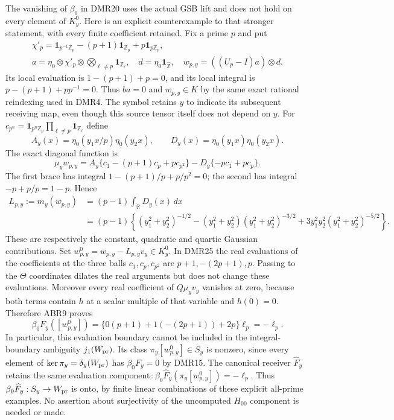 The vanishing of $\beta_0$ in DMR20 uses the actual GSB lift
and does not hold on every element of $K_y^0$. Here is an
explicit counterexample to that stronger statement, with
every finite coefficient retained. Fix a prime $p$ and put
\begin{equation}\tag{DMR24}
\begin{gathered}
\chi'_p=\mathbf1_{p^{-1}\mathbb Z_p}
              -(p+1)\mathbf1_{\mathbb Z_p}
              +p\mathbf1_{p\mathbb Z_p},\\
a=\eta_0\otimes\chi'_p\otimes
                  \bigotimes_{\ell\ne p}\mathbf1_{\mathbb Z_\ell},
\quad d=\eta_0\mathbf1_{\widehat{\mathbb Z}},
\quad w_{p,y}=((U_p-I)a)\otimes d.
\end{gathered}
\end{equation}
Its local evaluation is $1-(p+1)+p=0$, and its local integral
is $p-(p+1)+p p^{-1}=0$. Thus $ba=0$ and
$w_{p,y}\in K$ by the same exact rational reindexing used in
DMR4. The symbol retains $y$ to indicate its subsequent
receiving map, even though this source tensor itself does not
depend on $y$.
For $c_{p^n}=\mathbf1_{p^n\mathbb Z_p}
\prod_{\ell\ne p}\mathbf1_{\mathbb Z_\ell}$ define
\[
A_y(x)=\eta_0(y_1x/p)\eta_0(y_2x),\qquad
D_y(x)=\eta_0(y_1x)\eta_0(y_2x).
\]
The exact diagonal function is
\begin{equation}\tag{DMR25}
\mu_yw_{p,y}
=A_y\{c_1-(p+1)c_p+pc_{p^2}\}
 -D_y\{-pc_1+pc_p\}.
\end{equation}
The first brace has integral $1-(p+1)/p+p/p^2=0$;
the second has integral $-p+p/p=1-p$. Hence
\begin{equation}\tag{DMR26}
\begin{split}
L_{p,y}:=m_y(w_{p,y})
 &=(p-1)\int_{\mathbb R}D_y(x)\,dx\\
 &=(p-1)\left\{
 (y_1^2+y_2^2)^{-1/2}
 -(y_1^2+y_2^2)(y_1^2+y_2^2)^{-3/2}
 +3y_1^2y_2^2(y_1^2+y_2^2)^{-5/2}\right\}.
\end{split}
\end{equation}
These are respectively the constant, quadratic and quartic
Gaussian contributions. Set
$w^0_{p,y}=w_{p,y}-L_{p,y}v_y\in K_y^0$.
In DMR25 the real evaluations of the coefficients at the
three balls $c_1,c_p,c_{p^2}$ are
$p+1,-(2p+1),p$. Passing to the $\Theta$ coordinates dilates
the real arguments but does not change these evaluations.
Moreover every real coefficient of $Q\mu_yv_y$ vanishes
at zero, because both terms contain $h$ at a scalar multiple
of that variable and $h(0)=0$. Therefore ABR9 proves
\begin{equation}\tag{DMR27}
\beta_0F_y([w^0_{p,y}])
=\{0(p+1)+1(-(2p+1))+2p\}\ell_p=-\ell_p.
\end{equation}
In particular, this evaluation boundary cannot be included in
the integral-boundary ambiguity $j_1(W_{\rm pr})$.
Its class $\pi_y[w^0_{p,y}]\in S_y$ is nonzero, since every
element of $\ker\pi_y=\delta_y(W_{\rm pr})$ has
$\beta_0F_y=0$ by DMR15. The canonical receiver
$\widehat F_y$ retains the same evaluation component:
$\beta_0\widehat F_y(\pi_y[w^0_{p,y}])=-\ell_p$.
Thus $\beta_0\widehat F_y:S_y\to W_{\rm pr}$ is onto,
by finite linear combinations of these explicit all-prime
examples. No assertion about surjectivity of the uncomputed
$H_{00}$ component is needed or made.

